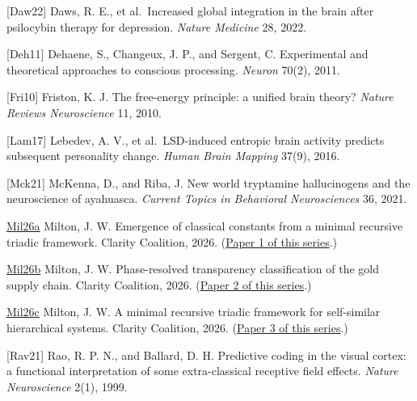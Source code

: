 \documentclass[
  11pt,
  letterpaper,
]{article}
\begin{document}
{[}Daw22{]} Daws, R. E., et al.~Increased global integration in the
brain after psilocybin therapy for depression. \emph{Nature Medicine}
28, 2022.

{[}Deh11{]} Dehaene, S., Changeux, J. P., and Sergent, C. Experimental
and theoretical approaches to conscious processing. \emph{Neuron} 70(2),
2011.

{[}Fri10{]} Friston, K. J. The free-energy principle: a unified brain
theory? \emph{Nature Reviews Neuroscience} 11, 2010.

{[}Lam17{]} Lebedev, A. V., et al.~LSD-induced entropic brain activity
predicts subsequent personality change. \emph{Human Brain Mapping}
37(9), 2016.

{[}Mck21{]} McKenna, D., and Riba, J. New world tryptamine hallucinogens
and the neuroscience of ayahuasca. \emph{Current Topics in Behavioral
Neurosciences} 36, 2021.

\href{https://github.com/baardev/truevalue/blob/main/docnav/Research/papers/1_recursive-tholonic-five-constants/1_recursive-tholonic-five-constants.pdf}{Mil26a}
Milton, J. W. Emergence of classical constants from a minimal recursive
triadic framework. Clarity Coalition, 2026.
(\href{https://github.com/baardev/truevalue/blob/main/docnav/Research/papers/1_recursive-tholonic-five-constants/1_recursive-tholonic-five-constants.pdf}{Paper
1 of this series}.)

\href{https://github.com/baardev/truevalue/blob/main/docnav/Research/papers/2_supply-chain-transparency-tvpci/2_supply-chain-transparency-tvpci.pdf}{Mil26b}
Milton, J. W. Phase-resolved transparency classification of the gold
supply chain. Clarity Coalition, 2026.
(\href{https://github.com/baardev/truevalue/blob/main/docnav/Research/papers/2_supply-chain-transparency-tvpci/2_supply-chain-transparency-tvpci.pdf}{Paper
2 of this series}.)

\href{https://github.com/baardev/truevalue/blob/main/docnav/Research/papers/3_minimal-recursive-triadic-framework/3_minimal-recursive-triadic-framework.pdf}{Mil26c}
Milton, J. W. A minimal recursive triadic framework for self-similar
hierarchical systems. Clarity Coalition, 2026.
(\href{https://github.com/baardev/truevalue/blob/main/docnav/Research/papers/3_minimal-recursive-triadic-framework/3_minimal-recursive-triadic-framework.pdf}{Paper
3 of this series}.)

{[}Rav21{]} Rao, R. P. N., and Ballard, D. H. Predictive coding in the
visual cortex: a functional interpretation of some extra-classical
receptive field effects. \emph{Nature Neuroscience} 2(1), 1999.
\end{document}
